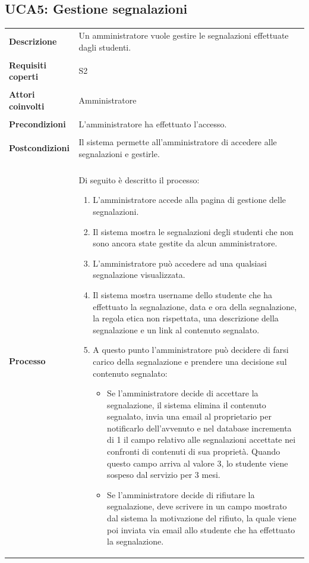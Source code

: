\documentclass[10pt,a4paper]{report}
\begin{document}
	\subsection{UCA5: Gestione segnalazioni}
	\begin{tabular}{lp{}}
		\textbf{Descrizione}&Un amministratore vuole gestire le segnalazioni effettuate dagli studenti.\\
		\\
		\textbf{Requisiti coperti}&S2\\
		\\
		\textbf{Attori coinvolti}&Amministratore\\
		\\
		\textbf{Precondizioni}&L'amministratore ha effettuato l'accesso.\\
		\\
		\textbf{Postcondizioni}&Il sistema permette all'amministratore di accedere alle segnalazioni e gestirle.\\
		\\
		\textbf{Processo}&Di seguito è descritto il processo:
		\begin{enumerate}
			\item L'amministratore accede alla pagina di gestione delle segnalazioni.
			\item Il sistema mostra le segnalazioni degli studenti che non sono ancora state gestite da alcun amministratore.
			\item L'amministratore può accedere ad una qualsiasi segnalazione visualizzata.
			\item Il sistema mostra username dello studente che ha effettuato la segnalazione, data e ora della segnalazione, la regola etica non rispettata, una descrizione della segnalazione e un link al contenuto segnalato. 
			\item A questo punto l'amministratore può decidere di farsi carico della segnalazione e prendere una decisione sul contenuto segnalato:
			\begin{itemize}
				\item Se l'amministratore decide di accettare la segnalazione, il sistema elimina il contenuto segnalato, invia una email al proprietario per notificarlo dell'avvenuto e nel database incrementa di 1 il campo relativo alle segnalazioni accettate nei confronti di contenuti di sua proprietà. Quando questo campo arriva al valore 3, lo studente viene sospeso dal servizio per 3 mesi.
				\item Se l'amministratore decide di rifiutare la segnalazione, deve scrivere in un campo mostrato dal sistema la motivazione del rifiuto, la quale viene poi inviata via email allo studente che ha effettuato la segnalazione.
			\end{itemize}
		\end{enumerate}
	\end{tabular}
	
\end{document}
